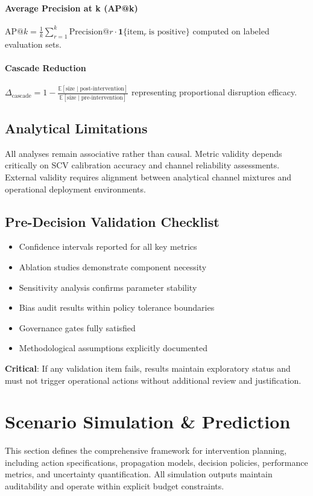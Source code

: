 \documentclass[12pt]{article}
\theoremstyle{plain}
\begin{document}
\paragraph{Average Precision at k (AP@k)}
$\displaystyle \text{AP@}k=\frac{1}{k}\sum_{r=1}^{k}\text{Precision@}r\cdot \mathbf{1}\{\text{item}_r\ \text{is positive}\}$ computed on labeled evaluation sets.

\paragraph{Cascade Reduction}
$\displaystyle \Delta_{\text{cascade}}=1-\frac{\mathbb{E}[\text{size} \mid \text{post-intervention}]}{\mathbb{E}[\text{size} \mid \text{pre-intervention}]}$ representing proportional disruption efficacy.

\subsection{Analytical Limitations}
All analyses remain associative rather than causal. Metric validity depends critically on SCV calibration accuracy and channel reliability assessments. External validity requires alignment between analytical channel mixtures and operational deployment environments.

\subsection{Pre-Decision Validation Checklist}
\begin{itemize}\itemsep0.2em
\item Confidence intervals reported for all key metrics
\item Ablation studies demonstrate component necessity
\item Sensitivity analysis confirms parameter stability
\item Bias audit results within policy tolerance boundaries
\item Governance gates fully satisfied
\item Methodological assumptions explicitly documented
\end{itemize}

\noindent \textbf{Critical}: If any validation item fails, results maintain exploratory status and must not trigger operational actions without additional review and justification.

\section{Scenario Simulation \& Prediction}
\label{sec:simulation}
\noindent This section defines the comprehensive framework for intervention planning, including action specifications, propagation models, decision policies, performance metrics, and uncertainty quantification. All simulation outputs maintain auditability and operate within explicit budget constraints.
\end{document}
